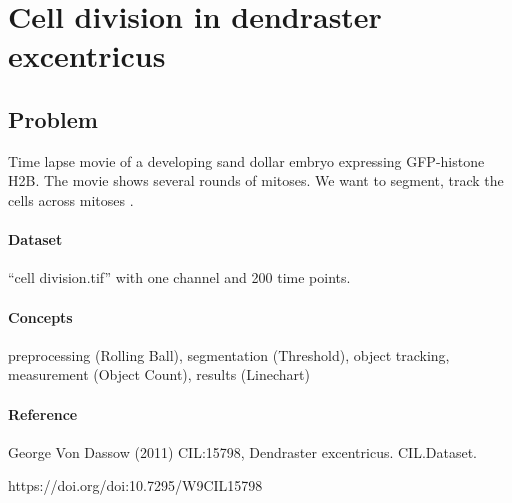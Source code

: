 \section{Cell division in dendraster excentricus}

\subsection{Problem}

Time lapse movie of a developing sand dollar embryo expressing GFP-histone H2B. The movie shows several rounds of mitoses. We want to segment, track the cells across mitoses .

\paragraph{Dataset} ``cell division.tif'' with one channel and 200 time points.

\paragraph{Concepts} 
preprocessing (Rolling Ball), 
segmentation (Threshold), 
object tracking, 
measurement (Object Count), 
results (Linechart)

\paragraph{Reference} 
George Von Dassow (2011) CIL:15798, Dendraster excentricus. CIL.Dataset. 

https://doi.org/doi:10.7295/W9CIL15798



